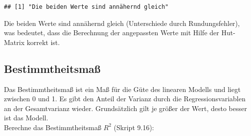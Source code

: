 \documentclass[]{article}
\newenvironment{Shaded}{\begin{snugshade}}{\end{snugshade}}
\newcommand{\ControlFlowTok}[1]{\textcolor[rgb]{0.13,0.29,0.53}{\textbf{#1}}}
\newcommand{\DecValTok}[1]{\textcolor[rgb]{0.00,0.00,0.81}{#1}}
\newcommand{\FloatTok}[1]{\textcolor[rgb]{0.00,0.00,0.81}{#1}}
\newcommand{\KeywordTok}[1]{\textcolor[rgb]{0.13,0.29,0.53}{\textbf{#1}}}
\newcommand{\NormalTok}[1]{#1}
\newcommand{\OperatorTok}[1]{\textcolor[rgb]{0.81,0.36,0.00}{\textbf{#1}}}
\newcommand{\StringTok}[1]{\textcolor[rgb]{0.31,0.60,0.02}{#1}}
\begin{document}
\begin{Shaded}
\end{Shaded}

\begin{verbatim}
## [1] "Die beiden Werte sind annähernd gleich"
\end{verbatim}

Die beiden Werte sind annähernd gleich (Unterschiede durch Rundungsfehler), was bedeutet, dass die Berechnung der angepassten Werte mit Hilfe der Hut-Matrix korrekt ist.

\hypertarget{bestimmtheitsmauxdf}{%
\subsection{Bestimmtheitsmaß}\label{bestimmtheitsmauxdf}}

Das Bestimmtheitsmaß ist ein Maß für die Güte des linearen Modells und liegt zwischen 0 und 1.
Es gibt den Anteil der Varianz durch die Regressionsvariablen an der Gesamtvarianz wieder. Grundsätzlich gilt je größer der Wert,
desto besser ist das Modell.\\
Berechne das Bestimmtheitsmaß \(R^2\) (Skript 9.16):

\begin{Shaded}
\end{Shaded}
\end{document}
